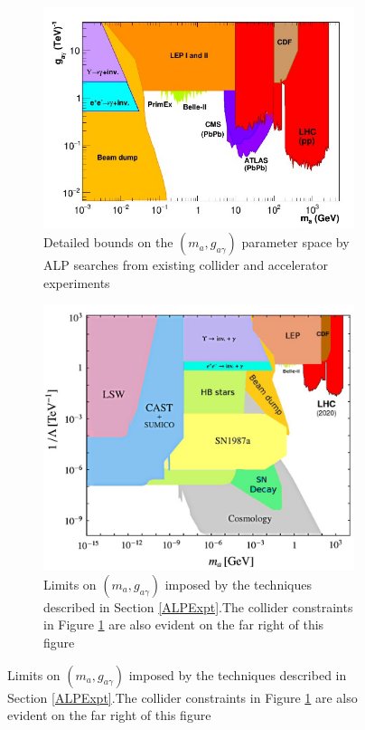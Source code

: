 \begin{figure}[H]
    \begin{subfigure}{0.4\textwidth}
    \includegraphics[scale = 0.77]{ALPColliderConstraints.jpg}
    \caption{Detailed bounds on the $(m_{a}, g_{a\gamma})$ parameter space by ALP searches from existing collider and accelerator experiments}
    \label{ALPColliderConstraints}
    \end{subfigure}
    \hfill
    \begin{subfigure}{0.4\textwidth}
        \includegraphics[scale = 0.39]{ALPExperimentalAndColliderConstraints.jpg}
        \caption{Limits on $(m_{a},g_{a\gamma})$ imposed by the techniques described in Section \ref{ALPExpt}.The collider constraints in Figure \ref{ALPColliderConstraints} are also evident on the far right of this figure}
        \label{ALPExperimentalAndColliderConstraints}
    \end{subfigure}
    \hfill
\end{figure}
